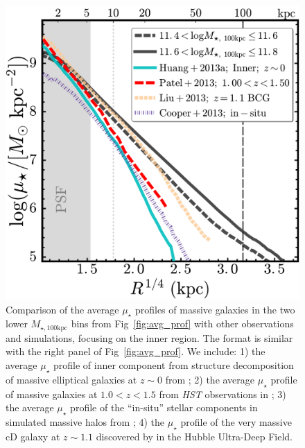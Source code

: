 \documentclass{emulateapj}
\def\mtot{{$M_{\star,100\mathrm{kpc}}$}}
\def\mden{{$\mu_{\star}$}}
\begin{document}
\begin{CJK*}{UTF8}{gbsn}
  \begin{figure}[bt!]
      \centering 
      \includegraphics[width=\columnwidth]{fig/redbcg_discussion_1}
      \caption{Comparison of the average \mden{} profiles of massive galaxies in the 
          two lower \mtot{} bins from Fig~\ref{fig:avg_prof} with other observations 
          and simulations, focusing on the inner region. 
          The format is similar with the right panel of Fig~\ref{fig:avg_prof}.
          We include: 
          1) the average \mden{} profile of inner component from structure 
          decomposition of massive elliptical galaxies at $z\sim 0$ from 
          \citet[][Cyan, solid]{Huang2013a}; 
          2) the average \mden{} profile of massive galaxies at $1.0 < z < 1.5$ 
          from \textit{HST} observations in \citet[][Red, dashed]{Patel2013}; 
          3) the average \mden{} profile of the ``in-situ'' stellar components in 
          simulated massive halos from \citet[][Purple, dot-dashed]{Cooper13};
          4) the \mden{} profile of the very massive cD galaxy at $z\sim 1.1$ 
          discovered by \citet[][Yellow, dashed]{Liu2013} in the Hubble 
          Ultra-Deep Field.}
      \label{fig:discussion_1}
  \end{figure}


\end{CJK*}
\end{document}
